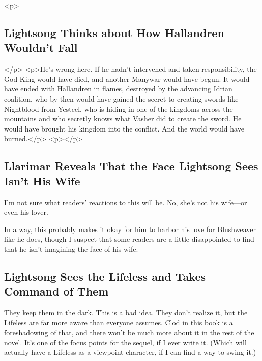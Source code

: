 <p>\subsection*{Lightsong Thinks about How Hallandren Wouldn’t Fall}</p>
<p>He’s wrong here. If he hadn’t intervened and taken responsibility, the God King would have died, and another Manywar would have begun. It would have ended with Hallandren in flames, destroyed by the advancing Idrian coalition, who by then would have gained the secret to creating swords like Nightblood from Yesteel, who is hiding in one of the kingdoms across the mountains and who secretly knows what Vasher did to create the sword. He would have brought his kingdom into the conflict. And the world would have burned.</p>
<p></p>

\subsection*{Llarimar Reveals That the Face Lightsong Sees Isn’t His Wife}

I’m not sure what readers’ reactions to this will be. No, she’s not his wife—or even his lover.

In a way, this probably makes it okay for him to harbor his love for Blushweaver like he does, though I suspect that some readers are a little disappointed to find that he isn’t imagining the face of his wife.

\subsection*{Lightsong Sees the Lifeless and Takes Command of Them}

They keep them in the dark. This is a bad idea. They don’t realize it, but the Lifeless are far more aware than everyone assumes. Clod in this book is a foreshadowing of that, and there won’t be much more about it in the rest of the novel. It’s one of the focus points for the sequel, if I ever write it. (Which will actually have a Lifeless as a viewpoint character, if I can find a way to swing it.)



